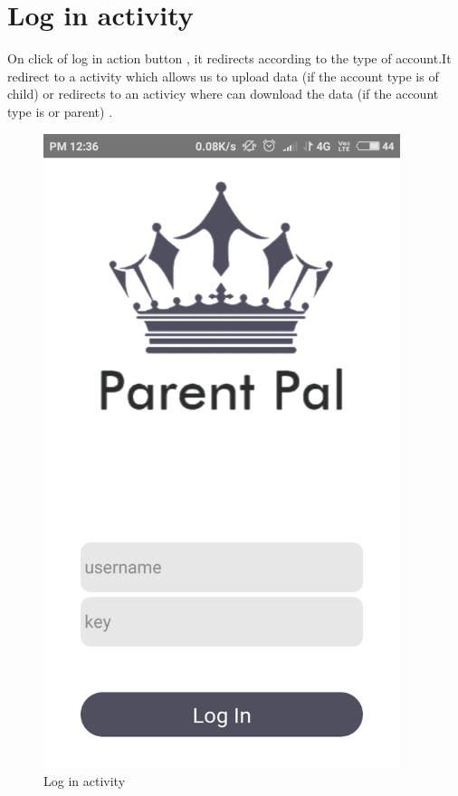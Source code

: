 \section{Log in activity}
On click of log in action button , it redirects according to the type of account.It redirect to a activity which allows us to upload data (if the account type is of child) or redirects to an activicy where can download the data (if the account type is or parent) .
\begin{figure}[!h]
	\centering
	\includegraphics[height=7.3in]{Login.PNG}
	\caption{Log in activity}
\end{figure}
\newpage

